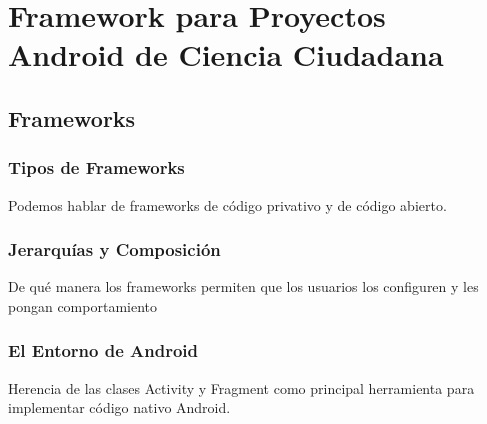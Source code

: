 \chapter{Framework para Proyectos Android de Ciencia Ciudadana}

\section{Frameworks}

\subsection{Tipos de Frameworks}
Podemos hablar de frameworks de código privativo y de código abierto.

\subsection{Jerarquías y Composición}
De qué manera los frameworks permiten que los usuarios los configuren y les pongan comportamiento

\subsection{El Entorno de Android}
Herencia de las clases Activity y Fragment como principal herramienta para implementar código nativo Android.